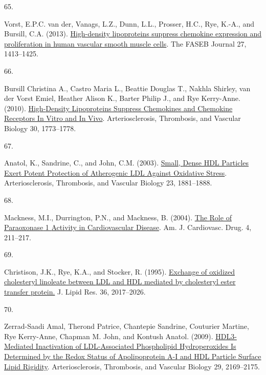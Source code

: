 \documentclass[
]{article}
\newlength{\cslhangindent}
\newlength{\csllabelwidth}
\newlength{\cslentryspacingunit} %
\newenvironment{CSLReferences}[2] %
 {%
  \setlength{\parindent}{0pt}
  \ifodd #1
  \let\oldpar\par
  \def\par{\hangindent=\cslhangindent\oldpar}
  \fi
  \setlength{\parskip}{#2\cslentryspacingunit}
 }%
 {}
\newcommand{\CSLLeftMargin}[1]{\parbox[t]{\csllabelwidth}{#1}}
\newcommand{\CSLRightInline}[1]{\parbox[t]{\linewidth - \csllabelwidth}{#1}\break}
\begin{document}
\begin{CSLReferences}{0}{0}
\leavevmode{}%
\CSLLeftMargin{65. }
\CSLRightInline{Vorst, E.P.C. van der, Vanags, L.Z., Dunn, L.L., Prosser, H.C., Rye, K.-A., and Bursill, C.A. (2013). \href{https://doi.org/10.1096/fj.12-212753}{High-density lipoproteins suppress chemokine expression and proliferation in human vascular smooth muscle cells}. The FASEB Journal 27, 1413--1425.}

\leavevmode{}%
\CSLLeftMargin{66. }
\CSLRightInline{Bursill Christina A., Castro Maria L., Beattie Douglas T., Nakhla Shirley, van der Vorst Emiel, Heather Alison K., Barter Philip J., and Rye Kerry-Anne. (2010). \href{https://doi.org/10.1161/ATVBAHA.110.211342}{High-{Density Lipoproteins Suppress Chemokines} and {Chemokine Receptors In Vitro} and {In Vivo}}. Arteriosclerosis, Thrombosis, and Vascular Biology 30, 1773--1778.}

\leavevmode{}%
\CSLLeftMargin{67. }
\CSLRightInline{Anatol, K., Sandrine, C., and John, C.M. (2003). \href{https://doi.org/10.1161/01.ATV.0000091338.93223.E8}{Small, {Dense HDL Particles Exert Potent Protection} of {Atherogenic LDL Against Oxidative Stress}}. Arteriosclerosis, Thrombosis, and Vascular Biology 23, 1881--1888.}

\leavevmode{}%
\CSLLeftMargin{68. }
\CSLRightInline{Mackness, M.I., Durrington, P.N., and Mackness, B. (2004). \href{https://doi.org/10.2165/00129784-200404040-00002}{The {Role} of {Paraoxonase} 1 {Activity} in {Cardiovascular Disease}}. Am. J. Cardiovasc. Drug. 4, 211--217.}

\leavevmode{}%
\CSLLeftMargin{69. }
\CSLRightInline{Christison, J.K., Rye, K.A., and Stocker, R. (1995). \href{https://doi.org/10.1016/S0022-2275(20)41119-8}{Exchange of oxidized cholesteryl linoleate between {LDL} and {HDL} mediated by cholesteryl ester transfer protein.} J. Lipid Res. 36, 2017--2026.}

\leavevmode{}%
\CSLLeftMargin{70. }
\CSLRightInline{Zerrad-Saadi Amal, Therond Patrice, Chantepie Sandrine, Couturier Martine, Rye Kerry-Anne, Chapman M. John, and Kontush Anatol. (2009). \href{https://doi.org/10.1161/ATVBAHA.109.194555}{{HDL3-Mediated Inactivation} of {LDL-Associated Phospholipid Hydroperoxides Is Determined} by the {Redox Status} of {Apolipoprotein A-I} and {HDL Particle Surface Lipid Rigidity}}. Arteriosclerosis, Thrombosis, and Vascular Biology 29, 2169--2175.}


\end{CSLReferences}
\end{document}
